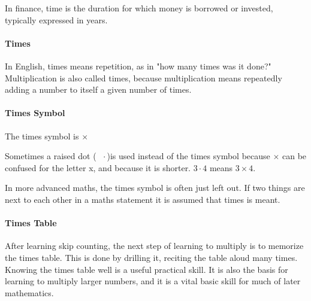\documentclass[12pt]{article}
\begin{document}
In finance, time is the duration for which money is borrowed or invested, typically expressed in years.

\paragraph{Times}
In English, times means repetition, as in "how many times was it done?" Multiplication is also called times, because multiplication means repeatedly adding a number to itself a given number of times.

\paragraph{Times Symbol}
The times symbol is $\times$

Sometimes a raised dot ($\text{ }\cdot$\text{ })is used instead of the times symbol because $\times$ can be confused for the letter x, and because it is shorter. $3 \cdot 4$ means $3 \times 4$.

In more advanced maths, the times symbol is often just left out. If two things are next to each other in a maths statement it is assumed that times is meant.

\paragraph{Times Table}
After learning skip counting, the next step of learning to multiply is to memorize the times table. This is done by drilling it, reciting the table aloud many times. Knowing the times table well is a  useful practical skill. It is also the basis for learning to multiply larger numbers, and it is a vital basic skill for much of later mathematics.
\end{document}
